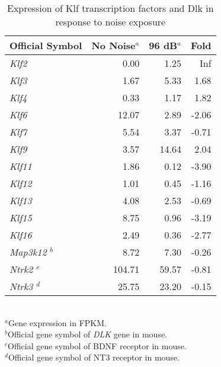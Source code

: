 \documentclass{article}
\begin{document}
\begin{table} 
\begin{small}
\caption{Expression of Klf transcription factors and Dlk in response to noise exposure}
\begin{tabular}{l r r r}
  \hline
 Official Symbol & No Noise$^a$ & 96 dB$^a$ & Fold\\ 
  \hline
 {\it Klf2} & 0.00 & 1.25 & Inf \\ 
  {\it Klf3} & 1.67 & 5.33 & 1.68 \\ 
  {\it Klf4} & 0.33 & 1.17 & 1.82 \\ 
 {\it Klf6} & 12.07 & 2.89 & -2.06 \\ 
  {\it Klf7} & 5.54 & 3.37 & -0.71 \\ 
  {\it Klf9} & 3.57 & 14.64 & 2.04 \\ 
   {\it Klf11} & 1.86 & 0.12 & -3.90 \\ 
  {\it Klf12} & 1.01 & 0.45 & -1.16 \\ 
  {\it Klf13} & 4.08 & 2.53 & -0.69 \\ 
   {\it Klf15} & 8.75 & 0.96 & -3.19 \\ 
  {\it Klf16} & 2.49 & 0.36 & -2.77 \\ 
  {\it Map3k12 $^b$} & 8.72 & 7.30    &     -0.26\\
  {\it Ntrk2 $^c$} & 104.71 & 59.57 &       -0.81 \\
{\it Ntrk3 $^d$} & 25.75 & 23.20 &          -0.15 \\
   \hline
\end{tabular}
\\$^a$Gene expression in FPKM.
\\$^b$Official gene symbol of {\it DLK} gene in mouse.
\\$^c$Official gene symbol of BDNF receptor in mouse.
\\$^d$Official gene symbol of NT3 receptor in mouse.
\label{tab:klf}
\end{small}
\end{table}
\end{document}
